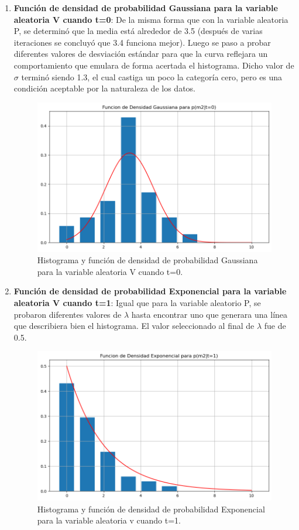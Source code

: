 \documentclass[spanish,english]{article}
\begin{document}
\begin{enumerate}
\begin{enumerate}
    \item \textbf{Funci\'{o}n de densidad de probabilidad Gaussiana para la variable aleatoria V cuando t=0}: De la misma forma que con la variable aleatoria P, se determin\'{o} que la media est\'{a} alrededor de 3.5 (despu\'{e}s de varias iteraciones se concluy\'{o} que 3.4 funciona mejor). Luego se paso a probar diferentes valores de desviaci\'{o}n est\'{a}ndar para que la curva reflejara un comportamiento que emulara de forma acertada el histograma. Dicho valor de $\sigma$ termin\'{o} siendo 1.3, el cual castiga un poco la categor\'{i}a cero, pero es una condici\'{o}n aceptable por la naturaleza de los datos.

    \begin{figure}[hbtp!]
        \centering
        \includegraphics[width=0.75\linewidth]{Quiz_2//Imagenes/pdf_viento_t0.png}
        \caption{Histograma y funci\'{o}n de densidad de probabilidad Gaussiana para la variable aleatoria V cuando t=0.}
        \label{fig:hist_pdf_v_t0}
    \end{figure}\newpage

    \item \textbf{Funci\'{o}n de densidad de probabilidad Exponencial para la variable aleatoria V cuando t=1}: Igual que para la variable aleatorio P, se probaron diferentes valores de $\lambda$ hasta encontrar uno que generara una l\'{i}nea que describiera bien el histograma. El valor seleccionado al final de $\lambda$ fue de 0.5.

    \begin{figure}[hbtp!]
        \centering
        \includegraphics[width=0.75\linewidth]{Quiz_2//Imagenes/pdf_viento_t1.png}
        \caption{Histograma y funci\'{o}n de densidad de probabilidad Exponencial para la variable aleatoria v cuando t=1.}
        \label{fig:hist_pdf_v_t1}
    \end{figure}
    

\end{enumerate}
\end{enumerate}
\end{document}
